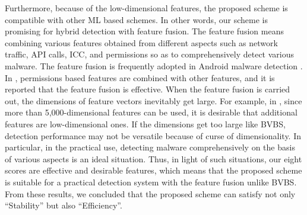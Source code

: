 \documentclass{ieeeaccess}
\begin{document}
Furthermore, because of the low-dimensional features, the proposed scheme is compatible with other ML based schemes.
In other words, our scheme is promising for hybrid detection with feature fusion.
The feature fusion means combining various features obtained from different aspects such as network traffic, API calls, ICC, and permissions so as to comprehensively detect various malware.
The feature fusion is frequently adopted in Android malware detection \cite{saracino2016madam, tao2017malpat, cai2018droidcat, arora2018ntpdroid}.
In \cite{saracino2016madam, arora2018ntpdroid}, permissions based features are combined with other features, and it is reported that the feature fusion is effective.
When the feature fusion is carried out, the dimensions of feature vectors inevitably get large.
For example, in \cite{xu2016iccdetector}, since more than 5,000-dimensional features can be used, it is desirable that additional features are low-dimensional ones.
If the dimensions get too large like BVBS, detection performance may not be versatile because of curse of dimensionality.
In particular, in the practical use, detecting malware comprehensively on the basis of various aspects is an ideal situation.
Thus, in light of such situations, our eight scores are effective and desirable features, which means that the proposed scheme is suitable for a practical detection system with the feature fusion unlike BVBS.
From these results, we concluded that the proposed scheme can satisfy not only ``Stability'' but also ``Efficiency''.

\end{document}
